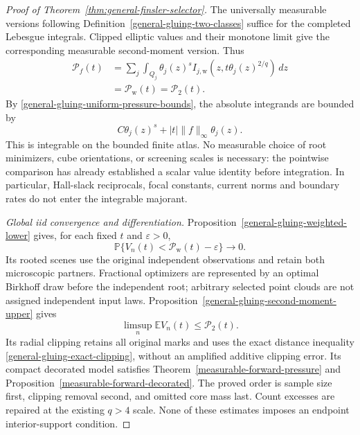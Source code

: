 \documentclass[11pt,reqno]{amsart}
\theoremstyle{definition}
\theoremstyle{remark}
\numberwithin{equation}{section}
\newcommand{\E}{\mathbb E}
\newcommand{\Pp}{\mathbb P}
\begin{document}
\begin{proof}[Proof of Theorem~\ref{thm:general-finsler-selector}]
The universally measurable versions following
Definition~\ref{general-gluing-two-classes} suffice for the completed
Lebesgue integrals. Clipped elliptic values and their monotone limit
give the corresponding measurable second-moment version. Thus
\begin{equation}
 \begin{split}
 \mathcal P_f(t)
 &=\sum_j\int_{Q_j}\theta_j(z)^s
       I_{j,\mathrm w}(z,t\theta_j(z)^{2/q})\,dz\\
 &=\mathcal P_{\mathrm w}(t)=\mathcal P_2(t).
 \end{split}
 \label{eq:general-finsler-common-pressure}
\end{equation}
By \eqref{general-gluing-uniform-pressure-bounds}, the absolute
integrands are bounded by
\[
                   C\theta_j(z)^s+|t|\|f\|_\infty\theta_j(z).
\]
This is integrable on the bounded finite atlas. No measurable
choice of root minimizers, cube orientations, or screening scales
is necessary: the pointwise comparison has already established a
scalar value identity before integration. In particular, Hall-slack
reciprocals, focal constants, current norms and boundary rates do
not enter the integrable majorant.

\emph{Global iid convergence and differentiation.}
Proposition~\ref{general-gluing-weighted-lower} gives, for each
fixed \(t\) and \(\varepsilon>0\),
\[
 \Pp\{V_n(t)<\mathcal P_{\mathrm w}(t)-\varepsilon\}\longrightarrow0.
\]
Its rooted scenes use the original independent observations and retain
both microscopic partners. Fractional optimizers are represented by
an optimal Birkhoff draw before the independent root; arbitrary
selected point clouds are not assigned independent input laws.
Proposition~\ref{general-gluing-second-moment-upper} gives
\[
                   \limsup_n\E V_n(t)\le\mathcal P_2(t).
\]
Its radial clipping retains all original marks and uses the exact
distance inequality \eqref{general-gluing-exact-clipping}, without
an amplified additive clipping error. Its compact decorated model
satisfies Theorem~\ref{measurable-forward-pressure} and
Proposition~\ref{measurable-forward-decorated}. The proved order is
sample size first, clipping removal second, and omitted core mass
last. Count excesses are repaired at the existing \(q>4\) scale.
None of these estimates imposes an endpoint interior-support condition.


\end{proof}
\end{document}
